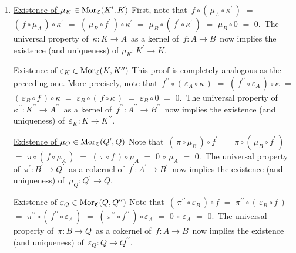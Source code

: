 \proof
\begin{enumerate}
\item
	\underline{Existence of $\mu_{K} \in \textnormal{Mor}_{\mathfrak{C}}(K^{\prime},K)$}
	\vskip -0.01cm
	First, note that
	\,$f \circ (\,\mu_{A} \circ \kappa^{\prime}\,)$
	\;$=$\; $(\,f \circ \mu_{A}\,)\circ \kappa^{\prime}$
	\;$=$\; $(\,\mu_{B}\circ f^{\prime}\,) \circ \kappa^{\prime}$
	\;$=$\; $\mu_{B} \circ (\,f^{\prime} \circ \kappa^{\prime}\,)$
	\;$=$\; $\mu_{B} \circ 0$
	\;$=$\; $0$.\,
	The universal property of
	\,$\kappa : K \longrightarrow A$\,
	as a kernel of
	\,$f : A \longrightarrow B$\,
	now implies the existence (and uniqueness) of $\mu_{K} : K^{\prime} \longrightarrow K$.
	\vskip 0.3cm

	\underline{Existence of $\varepsilon_{K} \in \textnormal{Mor}_{\mathfrak{C}}(K,K^{\prime\prime})$}
	\vskip -0.01cm
	This proof is completely analogous as the preceding one.
	More precisely, note that
	\,$f^{\prime\prime} \circ (\,\varepsilon_{A} \circ \kappa\,)$
	\;$=$\; $(\,f^{\prime\prime} \circ \varepsilon_{A}\,)\circ \kappa$
	\;$=$\; $(\,\varepsilon_{B} \circ f\,) \circ \kappa$
	\;$=$\; $\varepsilon_{B} \circ (\,f \circ \kappa\,)$
	\;$=$\; $\varepsilon_{B} \circ 0$
	\;$=$\; $0$.\,
	The universal property of
	\,$\kappa^{\prime\prime} : K^{\prime\prime} \longrightarrow A^{\prime\prime}$\,
	as a kernel of
	\,$f^{\prime\prime} : A^{\prime\prime} \longrightarrow B^{\prime\prime}$\,
	now implies the existence (and uniqueness) of
	\,$\varepsilon_{K} : K \longrightarrow K^{\prime\prime}$.
	\vskip 0.3cm

	\underline{Existence of $\mu_{Q} \in \textnormal{Mor}_{\mathfrak{C}}(Q^{\prime},Q)$}
	\vskip -0.01cm
	Note that
	\,$(\,\pi \circ \mu_{B}\,) \circ f^{\prime}$
	\;$=$\; $\pi \circ (\,\mu_{B} \circ f^{\prime}\,)$
	\;$=$\; $\pi \circ (\,f \circ \mu_{A}\,)$
	\;$=$\; $(\,\pi \circ f\,) \circ \mu_{A}$
	\;$=$\; $0 \,\circ\, \mu_{A}$
	\;$=$\; $0$.\,
	The universal property of
	\,$\pi^{\prime} : B^{\prime} \longrightarrow Q^{\prime}$\,
	as a cokernel of
	\,$f^{\prime} : A^{\prime} \longrightarrow B^{\prime}$\,
	now implies the existence (and uniqueness) of
	\,$\mu_{Q} : Q^{\prime} \longrightarrow Q$.
	\vskip 0.3cm

	\underline{Existence of $\varepsilon_{Q} \in \textnormal{Mor}_{\mathfrak{C}}(Q,Q^{\prime\prime})$}
	\vskip -0.01cm
	Note that
	\,$(\,\pi^{\prime\prime} \circ \varepsilon_{B}\,) \circ f$
	\;$=$\; $\pi^{\prime\prime} \circ (\,\varepsilon_{B} \circ f\,)$
	\;$=$\; $\pi^{\prime\prime} \circ (\,f^{\prime\prime} \circ \varepsilon_{A}\,)$
	\;$=$\; $(\,\pi^{\prime\prime} \circ f^{\prime\prime}\,) \circ \varepsilon_{A}$
	\;$=$\; $0 \,\circ\, \varepsilon_{A}$
	\;$=$\; $0$.\,
	The universal property of
	\,$\pi : B \longrightarrow Q$\,
	as a cokernel of
	\,$f : A \longrightarrow B$\,
	now implies the existence (and uniqueness) of
	\,$\varepsilon_{Q} : Q \longrightarrow Q^{\prime\prime}$.
	\vskip 0.5cm


\end{enumerate}
